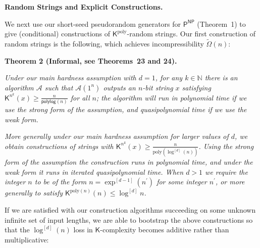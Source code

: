 \documentclass[10pt,a4paper]{article}
\begin{document}
\par\medskip\noindent\textbf{Random Strings and Explicit Constructions.}\par




We next use our short-seed pseudorandom generators for ${\mathsf{P}}^{{\mathsf{NP}}}$ (Theorem 1) to give (conditional) constructions of ${\mathsf{K}}^{\mathrm{poly}}$-random strings. Our first construction of random strings is the following, which achieves incompressibility $\tilde{\Omega}(n)$:\par





\par\medskip\noindent\textbf{
\textbf{Theorem 2}\textbf{ }(Informal, see Theorems 23 and 24)\textbf{.}
}\par



\emph{Under our main hardness assumption with $d=1$, for any $k\in\mathbb{N}$ there is an algorithm $\mathcal{A}$ such that $\mathcal{A}(1^{n})$ outputs an $n$-bit string $x$ satisfying ${\mathsf{K}}^{n^{k}}(x)\geq\frac{n}{{\mathsf{polylog}}(n)}$ for all $n$; the algorithm will run in polynomial time if we use the strong form of the assumption, and quasipolynomial time if we use the weak form.}\par




\emph{More generally under our main hardness assumption for larger values of $d$, we obtain constructions of strings with ${\mathsf{K}}^{n^{k}}(x)\geq\frac{n}{\mathrm{poly}(\log^{[d]}(n))}$. Using the strong form of the assumption the construction runs in polynomial time, and under the weak form it runs in iterated quasipolynomial time. When $d>1$ we require the integer $n$ to be of the form $n=\exp^{[d-1]}(n^{\prime})$ for some integer $n^{\prime}$, or more generally to satisfy ${\mathsf{K}}^{\mathrm{poly}(n)}(n)\leq\log^{[d]}n$.}\par






If we are satisfied with our construction algorithms succeeding on some unknown infinite set of input lengths, we are able to bootstrap the above constructions so that the $\log^{[d]}(n)$ loss in ${\mathsf{K}}$-complexity becomes additive rather than multiplicative:\par
\end{document}
